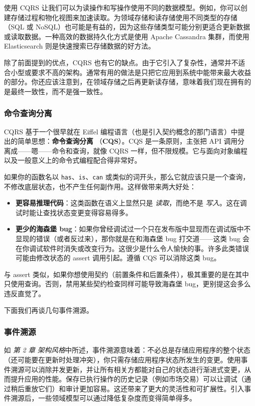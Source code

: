 使用 CQRS 让我们可以为读操作和写操作使用不同的数据模型。例如，你可以创建存储过程和物化视图来加速读取。为领域存储和读存储使用不同类型的存储（SQL 或 NoSQL）也可能是有益的，因为这些存储类型可能分别更适合更新数据或读取数据。一种高效的数据持久化方式是使用 Apache Cassandra 集群，而使用 Elasticsearch 则是快速搜索已存储数据的好方法。

\label{idx:379}
除了前面提到的优点，CQRS 也有它的缺点。由于它引入了复杂性，通常并不适合小型或要求不高的架构。通常有用的做法是只把它应用到系统中能带来最大收益的部分。你还应该注意到，在领域存储之后再更新读存储，意味着我们现在拥有的是最终一致性，而不是强一致性。

\subsubsection{命令查询分离}

\label{idx:380}
CQRS 基于一个很早就在 Eiffel 编程语言（也是引入契约概念的那门语言）中提出的简单思想：\textbf{命令查询分离 }（\textbf{CQS}）。CQS 是一条原则，主张把 API 调用分离成——嗯——命令和查询，就像 CQRS 一样，但不限规模。它与面向对象编程以及一般意义上的命令式编程配合得非常好。

如果你的函数名以 \texttt{has}、\texttt{is}、\texttt{can} 或类似的词开头，那么它就应该只是一个查询，不修改底层状态，也不产生任何副作用。这样做带来两大好处：

\begin{itemize}
\item \textbf{更容易推理代码}：这类函数在语义上显然只是 \emph{读取}，而绝不是 \emph{写入}。这在调试时能让查找状态变更变得容易得多。
\item \textbf{更少的海森堡 bug}：如果你曾经调试过一个只在发布版中显现而在调试版中不显现的错误（或者反过来），那你就是在和海森堡 bug 打交道——这类 bug 会在你调试软件时消失或改变行为。这很少是什么令人愉快的事。许多此类错误可能由修改状态的 assert 调用引起。遵循 CQS 可以消除这类 bug。
\end{itemize}

与 assert 类似，如果你想使用契约（前置条件和后置条件），极其重要的是在其中只使用查询。否则，禁用某些契约检查同样可能导致海森堡 bug，更别提这会多么违反直觉了。

下面我们再谈几句事件溯源。

\subsubsection{事件溯源}

\label{idx:381}
如 \emph{第 2 章} \emph{架构风格}中所述，事件溯源意味着：不必总是存储应用程序的整个状态（还可能要在更新时处理冲突），你只需存储应用程序状态所发生的变更。使用事件溯源可以消除并发更新，并让所有相关方都能对自己的状态进行渐进式变更，从而提升应用的性能。保存已执行操作的历史记录（例如市场交易）可以让调试（通过稍后重放它们）和审计更加容易。这还带来了更大的灵活性和可扩展性。引入事件溯源后，一些领域模型可以通过降低复杂度而变得简单得多。

